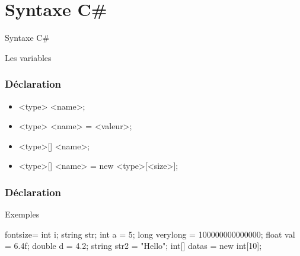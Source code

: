 \section{Syntaxe C\#}

\begingroup
{}
\begin{frame}
    \begin{center}
        \vspace{1cm}
        {\Large\color{background}
            Syntaxe C\#
        }
    \end{center}
\end{frame}
\endgroup

\begin{frame}
  \begin{center}
    \vspace{1cm}
    Les variables
  \end{center}
\end{frame}

\begin{frame}[c]
  \frametitle{Déclaration}

  \begin{center}
    \begin{itemize}
      \item<+-> <type> <name>;
      \item<+-> <type> <name> = <valeur>;
      \item<+-> <type>[] <name>;
      \item<+-> <type>[] <name> = new <type>[<size>];
    \end{itemize}
  \end{center}
\end{frame}

\begin{frame}[fragile]
  \frametitle{Déclaration}

  \begin{center}{\large Exemples}\end{center}
  \begin{csharpcode*}{fontsize=\scriptsize}
    int i;
    string str;
    int a = 5;
    long verylong = 100000000000000;
    float val = 6.4f;
    double d = 4.2;
    string str2 = "Hello";
    int[] datas = new int[10];
  \end{csharpcode*}
\end{frame}

